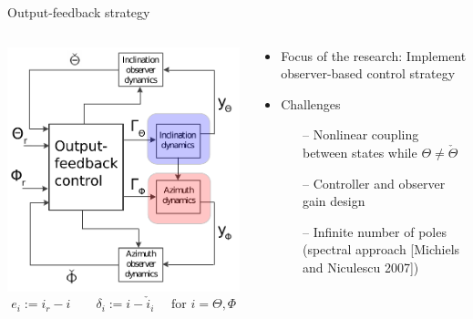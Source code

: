 \documentclass[10pt]{beamer}
\begin{document}
\begin{frame}{Output-feedback strategy}
	\begin{columns}
		\hspace{1cm}\begin{column}{0.5\textwidth}
			\includegraphics[width=1.1\textwidth]{images/ControlStrategyRobust.pdf}
		\footnotesize \begin{equation*}
								e_i := i_{r} - i \qquad \delta_i := i - \check{i}_i \quad \text{ for } i=\Theta,\Phi
					\end{equation*}
		\end{column}
		\begin{column}{0.5\textwidth}
			\begin{itemize}\setlength\itemsep{2.5em}
				\item Focus of the research: Implement observer-based control strategy
				\item Challenges
					\begin{itemize}
						\item[--]  Nonlinear coupling between states while $\Theta \ne \check{\Theta}$
						\item[--]  Controller and observer gain design
						\item[--]  Infinite number of poles (spectral approach [Michiels and Niculescu 2007])
					\end{itemize}
			\end{itemize}
		\end{column}
	\end{columns}
\end{frame}
\end{document}

